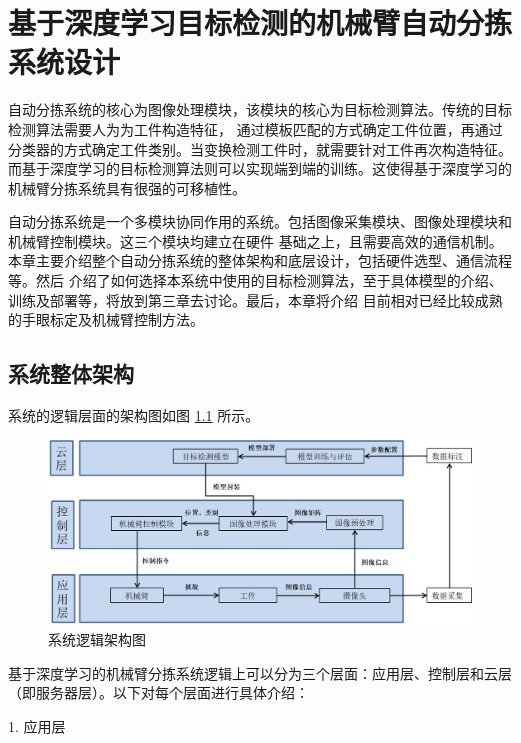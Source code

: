 
\chapter{基于深度学习目标检测的机械臂自动分拣系统设计}

自动分拣系统的核心为图像处理模块，该模块的核心为目标检测算法。传统的目标检测算法需要人为为工件构造特征，
通过模板匹配的方式确定工件位置，再通过分类器的方式确定工件类别。当变换检测工件时，就需要针对工件再次构造特征。
而基于深度学习的目标检测算法则可以实现端到端的训练。这使得基于深度学习的机械臂分拣系统具有很强的可移植性。

自动分拣系统是一个多模块协同作用的系统。包括图像采集模块、图像处理模块和机械臂控制模块。这三个模块均建立在硬件
基础之上，且需要高效的通信机制。本章主要介绍整个自动分拣系统的整体架构和底层设计，包括硬件选型、通信流程等。然后
介绍了如何选择本系统中使用的目标检测算法，至于具体模型的介绍、训练及部署等，将放到第三章去讨论。最后，本章将介绍
目前相对已经比较成熟的手眼标定及机械臂控制方法。

\section{系统整体架构}

系统的逻辑层面的架构图如图    \ref{fig:total_construct}
所示。

\begin{figure}[htbp]
    \centering
    \includegraphics[width=\textwidth]{pic/chap2/total_construct.jpg}
    \caption{系统逻辑架构图}
    \label{fig:total_construct}
\end{figure}

基于深度学习的机械臂分拣系统逻辑上可以分为三个层面：应用层、控制层和云层（即服务器层）。以下对每个层面进行具体介绍：

1. 应用层

